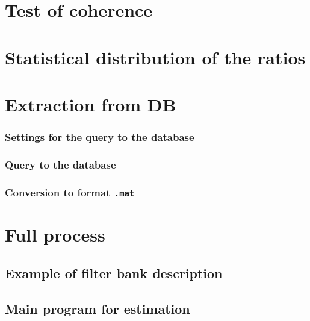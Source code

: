 \documentclass[a4paper, 12pt]{report}
\begin{document}
  \newpage
  \section{Test of coherence}
{\tiny }
 
 \newpage
 \section{Statistical distribution of the ratios}
{\tiny }

  
\newpage
  \section{Extraction from DB}
  
 \subsubsection{Settings for the query to the database}
{\tiny }

 \subsubsection{Query to the database}
{\tiny }

 \subsubsection{Conversion to format {\tt .mat}}
{\tiny }




\newpage
  \section{Full process}


  \subsection{Example of filter bank description}
{\tiny }

\subsection{Main program for estimation}
{\tiny }
\end{document}
